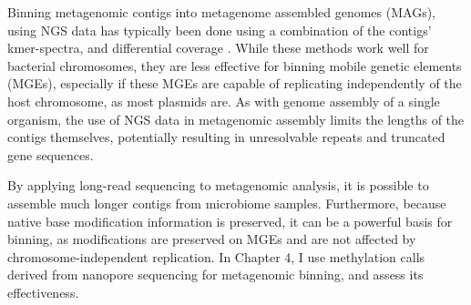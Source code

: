 Binning metagenomic contigs into metagenome assembled genomes (MAGs), using NGS data has typically been done using a combination of the contigs’ kmer-spectra, and differential coverage \citep{Ghurye2016-mb}. While these methods work well for bacterial chromosomes, they are less effective for binning mobile genetic elements (MGEs), especially if these MGEs are capable of replicating independently of the host chromosome, as most plasmids are. As with genome assembly of a single organism, the use of NGS data in metagenomic assembly limits the lengths of the contigs themselves, potentially resulting in unresolvable repeats and truncated gene sequences.

By applying long-read sequencing to metagenomic analysis, it is possible to assemble much longer contigs from microbiome samples. Furthermore, because native base modification information is preserved, it can be a powerful basis for binning, as modifications are preserved on MGEs and are not affected by chromosome-independent replication. In Chapter 4, I use methylation calls derived from nanopore sequencing for metagenomic binning, and assess its effectiveness.
